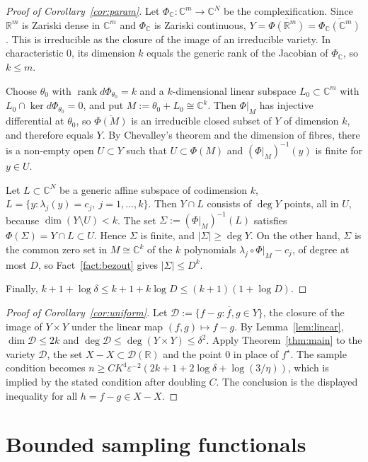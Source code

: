 \documentclass[11pt]{article}
\theoremstyle{definition}
\numberwithin{equation}{section}
\newcommand{\R}{\mathbb{R}}
\newcommand{\C}{\mathbb{C}}
\newcommand{\eps}{\varepsilon}
\newcommand{\fs}{f^{\star}}
\DeclareMathOperator{\rank}{rank}
\begin{document}
\begin{proof}[Proof of Corollary~\ref{cor:param}]
Let $\Phi_\C:\C^m\to\C^N$ be the complexification. Since $\R^m$ is Zariski dense in $\C^m$ and $\Phi_\C$ is Zariski continuous, $Y=\overline{\Phi(\R^m)}=\overline{\Phi_\C(\C^m)}$. This is irreducible as the closure of the image of an irreducible variety. In characteristic $0$, its dimension $k$ equals the generic rank of the Jacobian of $\Phi_\C$, so $k\le m$.

Choose $\theta_0$ with $\rank d\Phi_{\theta_0}=k$ and a $k$-dimensional linear subspace $L_0\subset\C^m$ with $L_0\cap\ker d\Phi_{\theta_0}=0$, and put $M:=\theta_0+L_0\cong\C^k$. Then $\Phi|_M$ has injective differential at $\theta_0$, so $\overline{\Phi(M)}$ is an irreducible closed subset of $Y$ of dimension $k$, and therefore equals $Y$. By Chevalley's theorem and the dimension of fibres, there is a non-empty open $U\subset Y$ such that $U\subset\Phi(M)$ and $(\Phi|_M)^{-1}(y)$ is finite for $y\in U$.

Let $L\subset\C^N$ be a generic affine subspace of codimension $k$, $L=\{y:\lambda_j(y)=c_j,\ j=1,\dots,k\}$. Then $Y\cap L$ consists of $\deg Y$ points, all in $U$, because $\dim(Y\setminus U)<k$. The set $\Sigma:=(\Phi|_M)^{-1}(L)$ satisfies $\Phi(\Sigma)=Y\cap L\subset U$. Hence $\Sigma$ is finite, and $|\Sigma|\ge\deg Y$. On the other hand, $\Sigma$ is the common zero set in $M\cong\C^k$ of the $k$ polynomials $\lambda_j\circ\Phi|_M-c_j$, of degree at most $D$, so Fact~\ref{fact:bezout} gives $|\Sigma|\le D^k$.

Finally, $k+1+\log\delta\le k+1+k\log D\le(k+1)(1+\log D)$.
\end{proof}

\begin{proof}[Proof of Corollary~\ref{cor:uniform}]
Let $\mathcal D:=\overline{\{f-g:f,g\in Y\}}$, the closure of the image of $Y\times Y$ under the linear map $(f,g)\mapsto f-g$. By Lemma~\ref{lem:linear}, $\dim\mathcal D\le2k$ and $\deg\mathcal D\le\deg(Y\times Y)\le\delta^2$. Apply Theorem~\ref{thm:main} to the variety $\mathcal D$, the set $X-X\subset\mathcal D(\R)$ and the point $0$ in place of $\fs$. The sample condition becomes $n\ge CK^4\eps^{-2}(2k+1+2\log\delta+\log(3/\eta))$, which is implied by the stated condition after doubling $C$. The conclusion is the displayed inequality for all $h=f-g\in X-X$.
\end{proof}

\section{Bounded sampling functionals}\label{sec:bounded}
\end{document}

